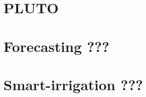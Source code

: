 \documentclass[a4paper,12pt,times,numbered,print,index]{Classes/PhDThesisPSnPDF}
\begin{document}
\chapter{PLUTO}
\label{precision-chap:pluto}

\chapter{Forecasting ???}
\label{precision-chap:forecasting}

\chapter{Smart-irrigation ???}
\label{precision-chap:smart-irrigation}

% 
% 
% 
% 
% 

% 
% 
% 
% 
% 
% 


\begin{spacing}{.8}

\cleardoublepage

\end{spacing}
\end{document}
